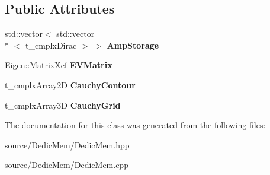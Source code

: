 \subsection*{Public Attributes}
\begin{DoxyCompactItemize}
\item 
\hypertarget{class_c___dedic_mem___b_s_e_a532449af372b4823ec11c1bac16a39f6}{std\-::vector$<$ std\-::vector\\*
$<$ t\-\_\-cmplx\-Dirac $>$ $>$ {\bfseries Amp\-Storage}}\label{class_c___dedic_mem___b_s_e_a532449af372b4823ec11c1bac16a39f6}

\item 
\hypertarget{class_c___dedic_mem___b_s_e_a5f0de44c8872d59b5db86058088e040e}{Eigen\-::\-Matrix\-Xcf {\bfseries E\-V\-Matrix}}\label{class_c___dedic_mem___b_s_e_a5f0de44c8872d59b5db86058088e040e}

\item 
\hypertarget{class_c___dedic_mem___b_s_e_adcbf7c4206df13acafeab297bc039f29}{t\-\_\-cmplx\-Array2\-D {\bfseries Cauchy\-Contour}}\label{class_c___dedic_mem___b_s_e_adcbf7c4206df13acafeab297bc039f29}

\item 
\hypertarget{class_c___dedic_mem___b_s_e_a0d11282e491e4762101a83d7e80e5733}{t\-\_\-cmplx\-Array3\-D {\bfseries Cauchy\-Grid}}\label{class_c___dedic_mem___b_s_e_a0d11282e491e4762101a83d7e80e5733}

\end{DoxyCompactItemize}


The documentation for this class was generated from the following files\-:\begin{DoxyCompactItemize}
\item 
source/\-Dedic\-Mem/Dedic\-Mem.\-hpp\item 
source/\-Dedic\-Mem/Dedic\-Mem.\-cpp\end{DoxyCompactItemize}
